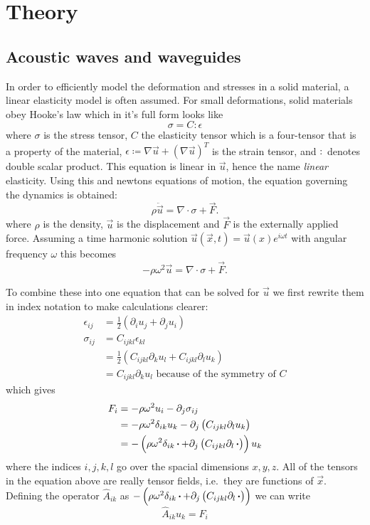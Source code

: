 \chapter{Theory}

\section{Acoustic waves and waveguides}

In order to efficiently model the deformation and stresses in a solid material,
a linear elasticity model is often assumed.
For small deformations, solid materials obey Hooke's law which in it's full form
looks like
\[
	\sigma = C : \epsilon
\]
where $\sigma$ is the stress tensor, $C$ the elasticity tensor which is a
four-tensor that is a property of the material,
$\epsilon \coloneqq \nabla \vec u + (\nabla \vec u)^T$
is the strain tensor, and $:$ denotes double scalar product.
This equation is linear in $\vec u$, hence the name \emph{linear} elasticity.
Using this and newtons equations of motion, the equation governing the dynamics
is obtained:
\[
	\rho \ddot{\vec{u}} = \nabla \cdot \sigma + \vec F.
\]
where $\rho$ is the density, $\vec{u}$ is the displacement and $\vec F$ is the
externally applied force.
Assuming a time harmonic solution
$\vec u(\vec x, t) = \vec u(x) e^{i \omega t}$
with angular frequency $\omega$ this becomes
\[
	-\rho \omega^2 \vec{u} = \nabla \cdot \sigma + \vec F.
\]

To combine these into one equation that can be solved for $\vec{u}$ we first
rewrite them in index notation to make calculations clearer:
\begin{align}
	\epsilon_{ij} &= \frac12(\partial_i u_j + \partial_j u_i)\\
	\sigma_{ij} &= C_{ijkl} \epsilon_{kl}\\
				&= \frac12\left(C_{ijkl} \partial_k u_l + C_{ijkl} \partial_l
				u_k\right)\\
				&= C_{ijkl} \partial_k u_l\text{ because of the symmetry of $C$}
\end{align}
which gives
\begin{align}
	F_{i} &= -\rho \omega^2 u_{i} - \partial_j \sigma_{ij}\\
		   &= -\rho \omega^2 \delta_{ik} u_{k} -
		   \partial_j \left(C_{ijkl} \partial_l u_k\right)\\
		   &= -\left(\rho \omega^2 \delta_{ik} \operatorname{\boldsymbol{\cdot}} + 
		   \partial_j \left(C_{ijkl} \partial_l \operatorname{\boldsymbol{\cdot}}\right)\right) u_k
\end{align}
where the indices $i,j,k,l$ go over the spacial dimensions $x,y,z$.
All of the tensors in the equation above are really tensor fields, i.e.\ they are
functions of $\vec{x}$.
Defining the operator $\hat A_{ik}$ as
$-\left(\rho \omega^2 \delta_{ik} \operatorname{\boldsymbol{\cdot}} + 
\partial_j \left(C_{ijkl} \partial_l \operatorname{\boldsymbol{\cdot}}\right)\right)$
we can write
\begin{equation}\label{eq:gov_eq}
	\hat A_{ik} u_k = F_i
\end{equation}

